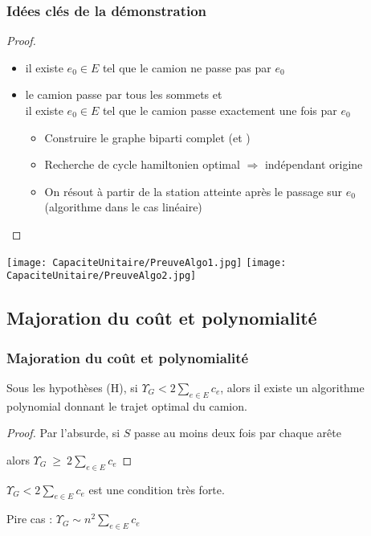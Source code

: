 \begin{frame}
\frametitle{Idées clés de la démonstration}

\begin{proof}
  \begin{itemize}
  \item<2-> il existe $e_0 \in E$ tel que le camion ne passe pas par $e_0$
  \item<3-> le camion passe par tous les sommets et\\
    il existe $e_0 \in E$ tel que le camion passe exactement une fois par $e_0$
    \begin{itemize}
    \item<4-> Construire le graphe biparti complet (\plus et \moins)
    \item<5-> Recherche de cycle hamiltonien optimal $\Rightarrow$ indépendant origine
    \item<6-> On résout à partir de la station atteinte après le passage sur $e_0$\\
    (algorithme dans le cas linéaire)
    \end{itemize}
  \end{itemize}
  \baselineskip
\end{proof}
{
  \begin{center}
    \texttt{[image: CapaciteUnitaire/PreuveAlgo1.jpg]}
    \hspace{2cm}
    \texttt{[image: CapaciteUnitaire/PreuveAlgo2.jpg]}
  \end{center}
}

\end{frame}


\subsection{Majoration du coût et polynomialité}

\begin{frame}
\frametitle{Majoration du coût et polynomialité}
{
  \begin{prop}
  Sous les hypothèses (H), si  $\Upsilon_G < 2\sum_{e \in E}c_e$, alors il existe un algorithme polynomial donnant le trajet optimal du camion.
  \end{prop}
}
{
  \begin{proof}
  Par l'absurde, si $S$ passe au moins deux fois par chaque arête
  
  alors $\Upsilon_G~\ge~2\sum_{e \in E}c_e$
    \baselineskip
  \end{proof}
}
{
  \begin{rmq}
  $\Upsilon_G < 2\sum_{e \in E}c_e$ est une condition très forte.
  
  Pire cas : $\Upsilon_G \sim n^2\sum_{e \in E}c_e$
  \end{rmq}
}

\end{frame}